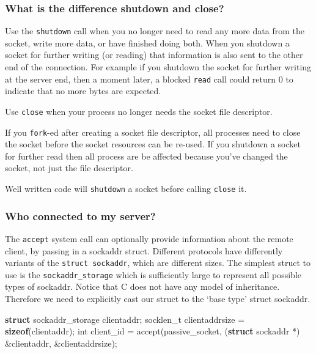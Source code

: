 \documentclass[]{article}
\newenvironment{Shaded}{}{}
\newcommand{\KeywordTok}[1]{\textcolor[rgb]{0.00,0.44,0.13}{\textbf{{#1}}}}
\newcommand{\DataTypeTok}[1]{\textcolor[rgb]{0.56,0.13,0.00}{{#1}}}
\newcommand{\NormalTok}[1]{{#1}}
\begin{document}
\subsubsection{What is the difference shutdown and
close?}\label{what-is-the-difference-shutdown-and-close}

Use the \texttt{shutdown} call when you no longer need to read any more
data from the socket, write more data, or have finished doing both. When
you shutdown a socket for further writing (or reading) that information
is also sent to the other end of the connection. For example if you
shutdown the socket for further writing at the server end, then a moment
later, a blocked \texttt{read} call could return 0 to indicate that no
more bytes are expected.

Use \texttt{close} when your process no longer needs the socket file
descriptor.

If you \texttt{fork}-ed after creating a socket file descriptor, all
processes need to close the socket before the socket resources can be
re-used. If you shutdown a socket for further read then all process are
be affected because you've changed the socket, not just the file
descriptor.

Well written code will \texttt{shutdown} a socket before calling
\texttt{close} it.

\subsubsection{Who connected to my
server?}\label{who-connected-to-my-server}

The \texttt{accept} system call can optionally provide information about
the remote client, by passing in a sockaddr struct. Different protocols
have differently variants of the \texttt{struct\ sockaddr}, which are
different sizes. The simplest struct to use is the
\texttt{sockaddr\_storage} which is sufficiently large to represent all
possible types of sockaddr. Notice that C does not have any model of
inheritance. Therefore we need to explicitly cast our struct to the
`base type' struct sockaddr.

\begin{Shaded}
\begin{Highlighting}[]
\KeywordTok{struct} \NormalTok{sockaddr_storage clientaddr;}
\NormalTok{socklen_t clientaddrsize = }\KeywordTok{sizeof}\NormalTok{(clientaddr);}
\DataTypeTok{int} \NormalTok{client_id = accept(passive_socket,}
        \NormalTok{(}\KeywordTok{struct} \NormalTok{sockaddr *) &clientaddr,}
         \NormalTok{&clientaddrsize);}
\end{Highlighting}
\end{Shaded}
\end{document}

